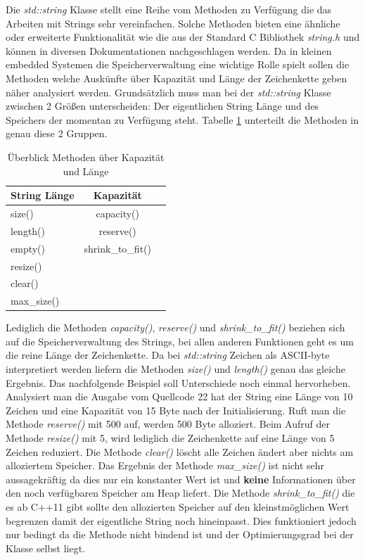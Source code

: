\documentclass[MES,Master,ngerman]{twbook}%
\begin{document}
Die \textit{std::string} Klasse stellt eine Reihe vom Methoden zu Verfügung die das Arbeiten mit Strings sehr vereinfachen. Solche Methoden bieten eine ähnliche oder erweiterte Funktionalität wie die aus der Standard C Bibliothek \textit{string.h} und können in diversen Dokumentationen nachgeschlagen werden. Da in kleinen embedded Systemen die Speicherverwaltung eine wichtige Rolle spielt sollen die Methoden welche Auskünfte über Kapazität und Länge der Zeichenkette geben näher analysiert werden. Grundsätzlich muss man bei der \textit{std::string} Klasse zwischen 2 Größen unterscheiden: Der eigentlichen String Länge und des Speichers der momentan zu Verfügung steht. Tabelle \ref{tbl:string_method} unterteilt die Methoden in genau diese 2 Gruppen.

\begin{table}[!htb]
	\centering
	\begin{tabular}{| l | c | r |}
		\hline
		\textbf{String Länge}  & \textbf{Kapazität} \\ \hline
		size()        & capacity()				\\ \hline
		length()      & reserve() 	    		\\ \hline
		empty()       & shrink\_to\_fit() 		\\ \hline
		resize()      &   						\\ \hline
		clear()       &   					 	\\ \hline
		max\_size()   & 						\\ \hline
	
	\end{tabular}
	
	\caption{Überblick Methoden über Kapazität und Länge}
	\label{tbl:string_method}
\end{table}
Lediglich die Methoden \textit{capacity()}, \textit{reserve()} und \textit{shrink\_to\_fit()} beziehen sich auf die Speicherverwaltung des Strings, bei allen anderen Funktionen geht es um die reine Länge der Zeichenkette. Da bei \textit{std::string} Zeichen als ASCII-byte interpretiert werden liefern die Methoden \textit{size()} und \textit{length()} genau das gleiche Ergebnis. Das nachfolgende Beispiel soll Unterschiede noch einmal hervorheben. \newline\newline
Analysiert man die Ausgabe vom Quellcode 22 hat der String eine Länge von 10 Zeichen und eine Kapazität von 15 Byte nach der Initialisierung. Ruft man die Methode \textit{reserve()} mit 500 auf, werden 500 Byte alloziert. Beim Aufruf der Methode \textit{resize()} mit 5, wird lediglich die Zeichenkette auf eine Länge von 5 Zeichen reduziert. Die Methode \textit{clear()} löscht alle Zeichen ändert aber nichts am alloziertem Speicher. Das Ergebnis der Methode \textit{max\_size()} ist nicht sehr aussagekräftig da dies nur ein konstanter Wert ist und \textbf{keine} Informationen über den noch verfügbaren Speicher am Heap liefert. Die Methode \textit{shrink\_to\_fit()} die es ab C++11 gibt sollte den allozierten Speicher auf den kleinstmöglichen Wert begrenzen damit der eigentliche String noch hineinpasst. Dies funktioniert jedoch nur bedingt da die Methode nicht bindend ist und der Optimierungsgrad bei der Klasse selbst liegt.
\end{document}
